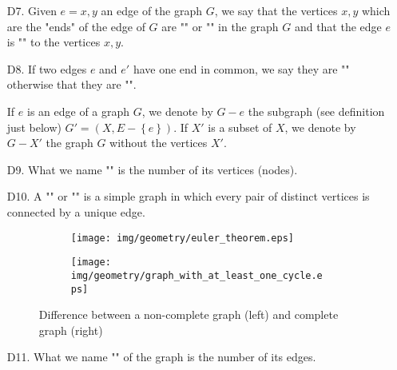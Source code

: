 {\begin{enumerate}
\begin{tcolorbox}[colframe=black,colback=white,sharp corners]
	which says that if the graph is drawn without any edges crossing, there would be $S=7$ faces. And there is no way to find a way to do that with $K_5$.
	\end{tcolorbox}
	 
	\item[D7.] Given $e={x,y}$ an edge of the graph $G$, we say that the vertices $x, y$ which are the "ends" of the edge of $G$ are "" or "" in the graph $G$ and that the edge $e$ is "" to the vertices $x, y$.
	
	\item[D8.] If two edges $e$ and $e'$ have one end in common, we say they are "" otherwise that they are "".
	
	\begin{tcolorbox}[title=Remark,colframe=black,arc=10pt]
If $e$ is an edge of a graph $G$, we denote by $G-e$ the subgraph (see definition just below) $G'=(X,E-\left\lbrace e \right\rbrace)$. If $X'$ is a subset of $X$, we denote by $G-X'$ the graph $G$ without the vertices $X'$.
	\end{tcolorbox}
	\item[D9.] What we name "" is the number of its vertices (nodes).
	
	\item[D10.] A "\label{complete graph}" or "" is a simple graph in which every pair of distinct vertices is connected by a unique edge.
	\begin{figure}[H]
		\centering
		\begin{subfigure}{0.4\textwidth}
			\texttt{[image: img/geometry/euler\_theorem.eps]}
		\end{subfigure}
		\begin{subfigure}{0.4\textwidth}
			\texttt{[image: img/geometry/graph\_with\_at\_least\_one\_cycle.eps]}
		\end{subfigure}		
		\caption{Difference between a non-complete graph (left) and complete graph (right)}		
	\end{figure}
	
	\item[D11.] What we name "" of the graph is the number of its edges.
	

\end{enumerate}}
